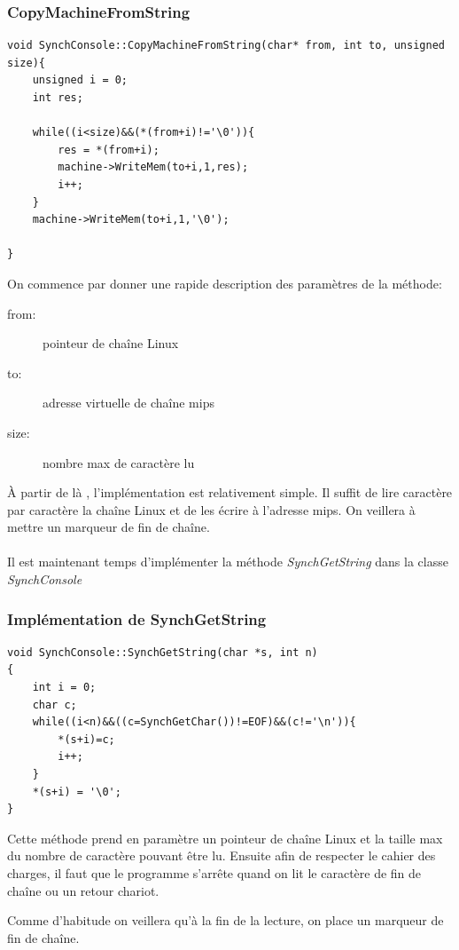 \documentclass[a4paper,10pt]{article}
\begin{document}
     \textcolor{TealBlue}{\subsubsection*{CopyMachineFromString}}
     \begin{lstlisting}
void SynchConsole::CopyMachineFromString(char* from, int to, unsigned size){
	unsigned i = 0;
	int res;

	while((i<size)&&(*(from+i)!='\0')){
		res = *(from+i);
		machine->WriteMem(to+i,1,res);
		i++;
	}
	machine->WriteMem(to+i,1,'\0');

}      
     \end{lstlisting}
     On commence par donner une rapide description des paramètres de la méthode:
      \begin{description}
       \item[from:] pointeur de chaîne Linux
       \item[to:] adresse virtuelle de chaîne mips
       \item[size:] nombre max de caractère lu
      \end{description}
    À partir de là , l'implémentation est relativement simple. Il suffit de lire caractère par caractère la chaîne Linux et de les écrire à l'adresse mips.
    On veillera à mettre un marqueur de fin de chaîne. \\
    ~~\\   
    Il est maintenant temps d'implémenter la méthode \emph{SynchGetString} dans la classe \emph{SynchConsole}
    
     \textcolor{TealBlue}{\subsubsection*{Implémentation de SynchGetString}}
     \begin{lstlisting}
void SynchConsole::SynchGetString(char *s, int n)
{
	int i = 0;
	char c;
	while((i<n)&&((c=SynchGetChar())!=EOF)&&(c!='\n')){
		*(s+i)=c;
		i++;
	}
	*(s+i) = '\0';
}      
     \end{lstlisting}
     Cette méthode prend en paramètre un pointeur de chaîne Linux et la taille max du nombre de caractère pouvant être lu. Ensuite afin de respecter le 
     cahier des charges, il faut que le programme s'arrête quand on lit le caractère de fin de chaîne ou un retour chariot.
     
     Comme d'habitude on veillera qu'à la fin de la lecture, on place un marqueur de fin de chaîne.\\
     
\end{document}

